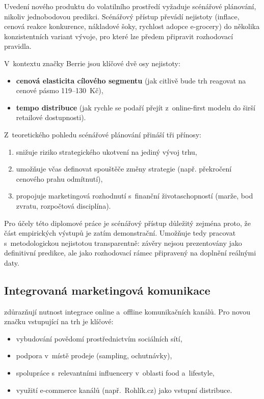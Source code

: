 Uvedení nového produktu do volatilního prostředí vyžaduje scénářové plánování, nikoliv jednobodovou predikci. Scénářový přístup převádí nejistoty (inflace, cenová reakce konkurence, nákladové šoky, rychlost adopce e-grocery) do několika konzistentních variant vývoje, pro které lze předem připravit rozhodovací pravidla.

V~kontextu značky Berrie jsou klíčové dvě osy nejistoty:
\begin{itemize}
  \item \textbf{cenová elasticita cílového segmentu} (jak citlivě bude trh reagovat na cenové pásmo 119--130~Kč),
  \item \textbf{tempo distribuce} (jak rychle se podaří přejít z~online-first modelu do širší retailové dostupnosti).
\end{itemize}

Z~teoretického pohledu scénářové plánování přináší tři přínosy:
\begin{enumerate}
  \item snižuje riziko strategického ukotvení na jediný vývoj trhu,
  \item umožňuje včas definovat spouštěče změny strategie (např. překročení cenového prahu odmítnutí),
  \item propojuje marketingová rozhodnutí s~finanční životaschopností (marže, bod zvratu, rozpočtová disciplína).
\end{enumerate}

Pro účely této diplomové práce je scénářový přístup důležitý zejména proto, že část empirických výstupů je zatím demonstrační. Umožňuje tedy pracovat s~metodologickou nejistotou transparentně: závěry nejsou prezentovány jako definitivní predikce, ale jako rozhodovací rámec připravený na doplnění reálnými daty.

\subsection{Integrovaná marketingová komunikace}

\textcite{chaffey_ellis_2019} zdůrazňují nutnost integrace online a~offline komunikačních kanálů. Pro novou značku vstupující na trh je klíčové:
\begin{itemize}
  \item vybudování povědomí prostřednictvím sociálních sítí,
  \item podpora v~místě prodeje (sampling, ochutnávky),
  \item spolupráce s~relevantními influencery v~oblasti food a~lifestyle,
  \item využití e-commerce kanálů (např.\ Rohlík.cz) jako vstupní distribuce.
\end{itemize}
